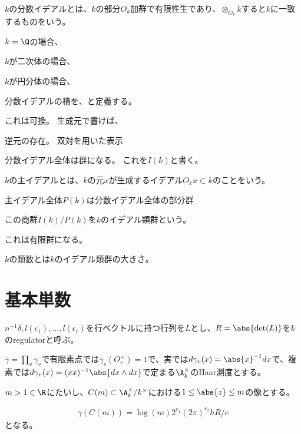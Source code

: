 \documentclass[uplatex, a4paper]{jsbook}
\begin{document}
\begin{dfn}
$k$の分数イデアルとは、$k$の部分$O_k$加群で有限性生であり、$\otimes_{O_k}k$すると$k$に一致するものをいう。
\end{dfn}

\begin{eg}
$k=\Q$の場合、

$k$が二次体の場合、

$k$が円分体の場合、
\end{eg}

\begin{dfn}
分数イデアルの積を、と定義する。
\end{dfn}

これは可換。
生成元で書けば、

逆元の存在。
双対を用いた表示

分数イデアル全体は群になる。
これを$I(k)$と書く。

$k$の主イデアルとは、$k$の元$x$が生成するイデアル$O_kx \subset k$のことをいう。

主イデアル全体$P(k)$は分数イデアル全体の部分群

\begin{dfn}
この商群$I(k)/P(k)$を$k$のイデアル類群という。
\end{dfn}

これは有限群になる。

$k$の類数とは$k$のイデアル類群の大きさ。

\section{基本単数}

\begin{dfn}[Definition 7, p.94]
$n^{-1}\delta, l(\epsilon_1),\ldots,l(\epsilon_r)$を行ベクトルに持つ行列を$L$とし、$R=\abs{\det(L)}$を$k$のregulatorと呼ぶ。
\end{dfn}

\begin{prop}[Proposition 9, p.95]
$\gamma=\prod_v\gamma_v$で有限素点では$\gamma_v(O_v^\times)=1$で、実では$d\gamma_v(x)=\abs{x}^{-1}dx$で、複素では$d\gamma_v(x)=(x\bar{x})^{-1}\abs{dx\wedge d\bar{x}}$で定まる$\A_k^\times$のHaar測度とする。

$m>1 \in \R$にたいし、$C(m) \subset \A_k^\times / k^\times$における$1\leq \abs{z}\leq m$の像とする。

\begin{align*}
\gamma(C(m)) = \log(m)2^{r_1}(2\pi)^{r_2}hR/e
\end{align*}
となる。
\end{prop}
\end{document}
